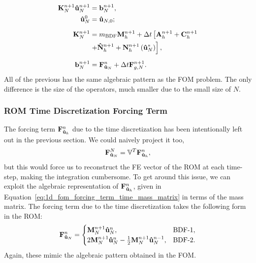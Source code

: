 \documentclass[../../thesis.tex]{subfiles}
\newcommand{\rbV}{\ensuremath{\mathbb{V}}}
\newcommand{\rbVT}{\ensuremath{\rbV^T}}
\newcommand{\dt}{\ensuremath{\Delta t}}
\newcommand{\Ah}[1]{\ensuremath{\vb{#1}^{n+1}_h}}
\begin{document}
\begin{subequations}
    \label{eq:1d_rom_linear_system_timestep}
    \begin{align}
        \vb{K}_{N}^{n+1} \vb{\hat{u}}_{N}^{n+1} &= \vb{b}_{N}^{n+1}, 
        \\
        \vb{\hat{u}}_{N}^{0} &= \vb{\hat{u}}_{N,0};
        \\[2mm]
        \vb{K}_{N}^{n+1} &= m_{\text{BDF}} \Ah{M} + \dt \left[\Ah{A} + \Ah{C} \right. 
        \nonumber 
        \\
                        &\left. + \Ah{\hat{N}} + \Ah{N}\left(\vb{\hat{u}}_{N}^{*}\right)\right],
        \\[2mm]
        \vb{b}_{N}^{n+1} &= \vb{F}_{\vb{\hat{u}}_{N}}^{n} + \dt \vb{F}_{g,N}^{n+1}.
    \end{align}
\end{subequations}
All of the previous has the same algebraic pattern as the FOM problem.
The only difference is the size of the operators, much smaller due to the small size of $N$. 

\subsubsection{ROM Time Discretization Forcing Term}
The forcing term $\vb{F}_{\vb{\hat{u}}_h}^{n}$ due to the time discretization has been intentionally left out in the previous section.
We could naively project it too, 
\begin{equation}
    \vb{F}_{\vb{\hat{u}}_N}^{N} = \rbVT \vb{F}_{\vb{\hat{u}}_h}^{n},
\end{equation}
but this would force us to reconstruct the FE vector of the ROM at each time-step, making the integration cumbersome.
To get around this issue, we can exploit the algebraic representation of $\vb{F}_{\vb{\hat{u}}_h}^{n}$, 
given in Equation~\eqref{eq:1d_fom_forcing_term_time_mass_matrix} in terms of the mass matrix. 
The forcing term due to the time discretization takes the following form in the ROM:
\begin{equation}
    \vb{F}_{\vb{\hat{u}}_N}^{n} = 
    \begin{cases}
        \vb{M}_{N}^{n+1} \vb{\hat{u}}_{N}^{n},                & \text{BDF-1},
        \\
        2 \vb{M}_{N}^{n+1} \vb{\hat{u}}_{N}^{n}
        - \frac{1}{2}\vb{M}_{N}^{n+1} \vb{\hat{u}}_{N}^{n-1}, & \text{BDF-2}.
    \end{cases}
\end{equation}
Again, these mimic the algebraic pattern obtained in the FOM.
\end{document}
